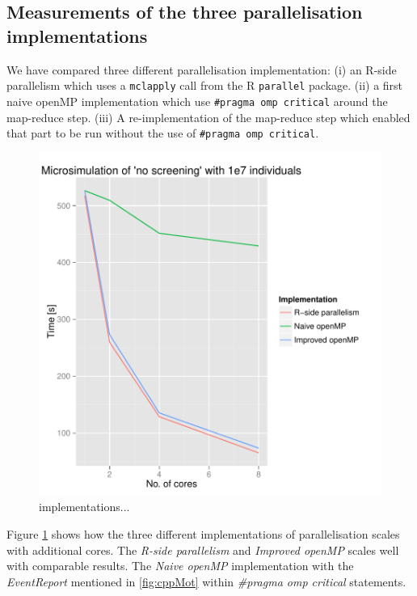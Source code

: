 \subsection{Measurements of the three parallelisation implementations}

We have compared three different parallelisation implementation: (i)
an R-side parallelism which uses a \texttt{mclapply} call from the R
\texttt{parallel} package. (ii) a first naive openMP implementation
which use \texttt{#pragma omp critical} around the map-reduce
step. (iii) A re-implementation of the map-reduce step which enabled
that part to be run without the use of \texttt{#pragma omp critical}.
\begin{figure}[!htbp] \centering
  \includegraphics[height=0.5\textheight]{images/implementationProfiling.pdf}
  \caption{implementations...}
  \label{fig:implScaling}
\end{figure} 

Figure \ref{fig:implScaling} shows how the three
different implementations of parallelisation scales with additional
cores. The \emph{R-side parallelism} and \emph{Improved openMP} scales
well with comparable results. The \emph{Naive openMP} implementation
with the \emph{EventReport} mentioned in \ref{fig:cppMot} within
\emph{\#pragma omp critical} statements.

